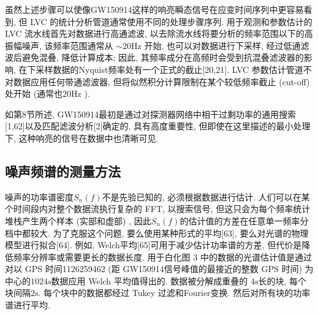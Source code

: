 \documentclass[a4paper]{\documentclassname}
\def\t{\text}
\theoremstyle{definition}
\begin{document}
虽然上述步骤可以使像GW150914这样的响亮瞬态信号在应变时间序列中更容易看到, 但 LVC 的统计分析管道通常使用不同的处理步骤序列. 用于观测和参数估计的 LVC 流水线首先对数据进行高通滤波, 以去除流水线将要分析的频率范围以下的高振幅噪声, 该频率范围通常从 $\sim20\t{Hz}$ 开始. 也可以对数据进行下采样, 经过低通滤波后避免混叠, 降低计算成本; 因此, 其频率成分在高频时会受到抗混叠滤波器的影响, 在下采样数据的Nyquist频率处有一个正式的截止[20,21].  LVC 参数估计管道不对数据应用任何带通滤波器, 但将似然积分计算限制在某个较低频率截止 (cut-off) 处开始 (通常也$20\t{Hz}$ ).

如第8节所述, GW150914最初是通过对探测器网络中相干过剩功率的通用搜索[1,62]以及匹配滤波分析[2]确定的, 具有高度重要性, 但即使在这里描述的最小处理下, 这种响亮的信号在数据中也清晰可见. 

\subsection{噪声频谱的测量方法}

噪声的功率谱密度$S_n(f)$不是先验已知的, 必须根据数据进行估计. 人们可以在某个时间段内对整个数据流执行复杂的 FFT, 以搜索信号, 但这只会为每个频率统计堆栈产生两个样本 (实部和虚部) , 因此$S_n(f)$的估计值的方差在任意单一频率分档中都较大. 为了克服这个问题, 要么使用某种形式的平均[63], 要么对光谱的物理模型进行拟合[64]. 例如, Welch平均[65]可用于减少估计功率谱的方差, 但代价是降低频率分辨率或需要更长的数据长度. 用于白化图 3 中的数据的光谱估计值是通过对以 GPS 时间1126259462 (距 GW150914信号峰值的最接近的整数 GPS 时间) 为中心的$ 1024 \t{s}$数据应用 Welch 平均值得出的. 数据被分解成重叠的 $4 \t{s}$长的块, 每个块间隔$ 2 \t{s}$. 每个块中的数据都经过 Tukey 过滤和Fourier变换. 然后对所有块的功率谱进行平均. 
\end{document}
